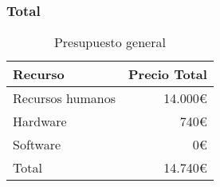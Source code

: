 \subsubsection{Total}
\begin{table}
    \centering
    \begin{tabular}[ht]{l|r}
        \textbf{Recurso} & \textbf{Precio Total} \\
        \hline
        Recursos humanos & 14.000\euro           \\
        Hardware         & 740\euro              \\
        Software         & 0\euro                \\
        \hline
        Total            & 14.740\euro           \\
    \end{tabular}
    \caption{Presupuesto general}
    \label{tab:total-budget}
\end{table}

\pagebreak